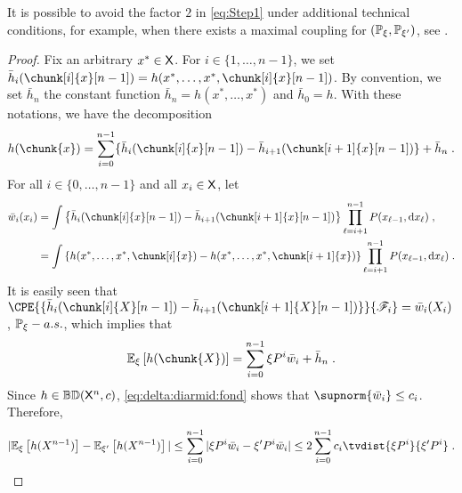 \documentclass[leqno,11pt,a4paper]{article}
\begin{document}
\begin{remark}
 It is possible to avoid the factor $2$ in \eqref{eq:Step1} under additional technical conditions, for example, when there exists a maximal coupling for $(\mathbb{P}_\xi,\mathbb{P}_{\xi'})$, see \cite[Lemma 23.2.1]{douc:moulines:priouret:soulier:2018}.
\end{remark}
\begin{proof}
Fix an arbitrary
$x^* \in \mathsf{X}$. For $i \in \{1,\ldots,n-1\}$, we set $\bar{h}_i(\chunk[i]{x}[n-1])=h(x^*,\dots,x^*,\chunk[i]{x}[n-1])$. By convention,
we set $\bar{h}_n$ the constant function $\bar{h}_n=h(x^*,\ldots,x^*)$ and $\bar{h}_0=h$. With these
notations, we have the decomposition
\[
h(\chunk{x})=\sum_{i=0}^{n-1} \{\bar{h}_i(\chunk[i]{x}[n-1]) - \bar{h}_{i+1}(\chunk[i+1]{x}[n-1]) \} +\bar{h}_n \eqsp.
\]
For all $i \in \{0,\ldots,n-1\}$ and all $x_i \in \mathsf{X}$, let
\begin{align}
\bar{w}_i(x_i)&=\int \lrcb{\bar{h}_i(\chunk[i]{x}[n-1])-\bar{h}_{i+1}(\chunk[i+1]{x}[n-1])}  \prod_{\ell=i+1}^{n-1} P(x_{\ell-1}, \rmd x_{\ell})\eqsp, \nonumber \\
&=\int \lrcb{h(x^*,\ldots,x^*,\chunk[i]{x})-h(x^*,\ldots,x^*,\chunk[i+1]{x})}  \prod_{\ell=i+1}^{n-1} P(x_{\ell-1}, \rmd x_{\ell}) \eqsp. \label{eq:delta:diarmid:fond}
\end{align}
It is easily seen that $\CPE{\{\bar{h}_i(\chunk[i]{X}[n-1])-\bar{h}_{i+1}(\chunk[i+1]{X}[n-1])\}}{\cF_{i}}=\bar{w}_i(X_i)$, $\mathbb{P}_\xi-a.s.$,  which implies that
\[
\Ebb_\xi \lrb{h(\chunk{X})}=\sum_{i=0}^{n-1} \xi P^i \bar{w}_i + \bar{h}_n \eqsp.
\]
Since  $h \in\mathbb{BD}(\mathsf{X}^n,c)$, \eqref{eq:delta:diarmid:fond} shows that  $\supnorm{\bar{w}_i} \leq c_i$.
Therefore,
\[
|\Ebb_\xi \lrb{h(X^{n-1})}-\Ebb_{\xi'} \lrb{h(X^{n-1})} |\\
\leq \sum_{i=0}^{n-1} |\xi P^i \bar{w}_i-\xi' P^i \bar{w}_i| \leq 2 \sum_{i=0}^{n-1} c_{i}\tvdist{\xi P^{i}}{\xi' P^{i}} \eqsp.
\]
\end{proof}
\end{document}
